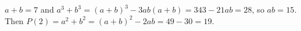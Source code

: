 $a+b=7$ and $a^3+b^3=(a+b)^3-3ab(a+b)=343-21ab=28$, so $ab=15$. Then $P(2)=a^2+b^2=(a+b)^2-2ab=49-30=\boxed{19}$.
